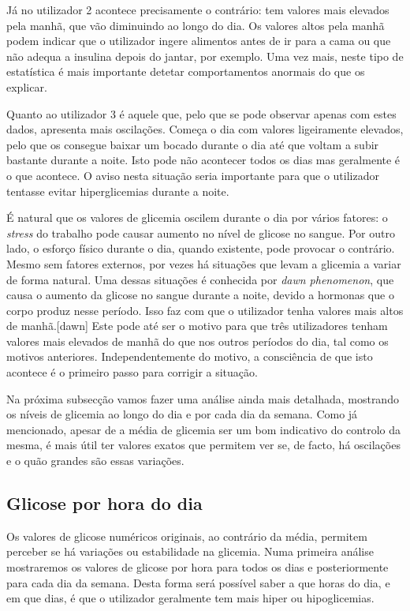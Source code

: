 Já no utilizador 2 acontece precisamente o contrário: tem valores mais elevados pela manhã, que vão diminuindo ao longo do dia. Os valores altos pela manhã podem indicar que o utilizador ingere alimentos antes de ir para a cama ou que não adequa a insulina depois do jantar, por exemplo. Uma vez mais, neste tipo de estatística é mais importante detetar comportamentos anormais do que os explicar. 

Quanto ao utilizador 3 é aquele que, pelo que se pode observar apenas com estes dados, apresenta mais oscilações. Começa o dia com valores ligeiramente elevados, pelo que os consegue baixar um bocado durante o dia até que voltam a subir bastante durante a noite. Isto pode não acontecer todos os dias mas geralmente é o que acontece. O aviso nesta situação seria importante para que o utilizador tentasse evitar hiperglicemias durante a noite.

É natural que os valores de glicemia oscilem durante o dia por vários fatores: o \textit{stress} do trabalho pode causar aumento no nível de glicose no sangue. Por outro lado, o esforço físico durante o dia, quando existente, pode provocar o contrário. Mesmo sem fatores externos, por vezes há situações que levam a glicemia a variar de forma natural. Uma dessas situações é conhecida por \textit{dawn phenomenon}, que causa o aumento da glicose no sangue durante a noite, devido a hormonas que o corpo produz nesse período. Isso faz com que o utilizador tenha valores mais altos de manhã.[dawn] Este pode até ser o motivo para que três utilizadores tenham valores mais elevados de manhã do que nos outros períodos do dia, tal como os motivos anteriores. Independentemente do motivo, a consciência de que isto acontece é o primeiro passo para corrigir a situação.\newline



Na próxima subsecção vamos fazer uma análise ainda mais detalhada, mostrando os níveis de glicemia ao longo do dia e por cada dia da semana. Como já mencionado, apesar de a média de glicemia ser um bom indicativo do controlo da mesma, é mais útil ter valores exatos que permitem ver se, de facto, há oscilações e o quão grandes são essas variações.

\subsection{Glicose por hora do dia}

Os valores de glicose numéricos originais, ao contrário da média, permitem perceber se há variações ou estabilidade na glicemia. Numa primeira análise mostraremos os valores de glicose por hora para todos os dias e posteriormente para cada dia da semana. Desta forma será possível saber a que horas do dia, e em que dias, é que o utilizador geralmente tem mais hiper ou hipoglicemias.\newpage

